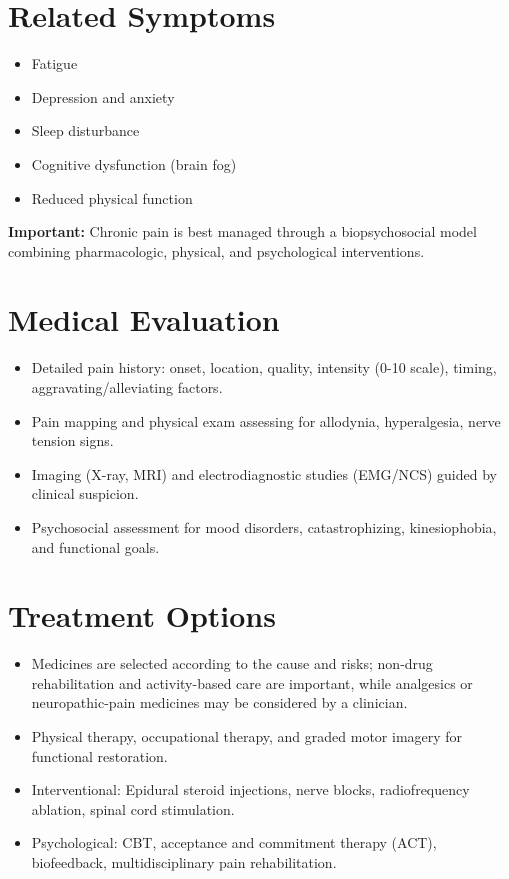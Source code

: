 \section*{Related Symptoms}
\begin{itemize}
  \item Fatigue
  \item Depression and anxiety
  \item Sleep disturbance
  \item Cognitive dysfunction (brain fog)
  \item Reduced physical function
\end{itemize}
\textbf{Important:} Chronic pain is best managed through a biopsychosocial model combining pharmacologic, physical, and psychological interventions.

\section*{Medical Evaluation}
\begin{itemize}
  \item Detailed pain history: onset, location, quality, intensity (0-10 scale), timing, aggravating/alleviating factors.
  \item Pain mapping and physical exam assessing for allodynia, hyperalgesia, nerve tension signs.
  \item Imaging (X-ray, MRI) and electrodiagnostic studies (EMG/NCS) guided by clinical suspicion.
  \item Psychosocial assessment for mood disorders, catastrophizing, kinesiophobia, and functional goals.
\end{itemize}

\section*{Treatment Options}
\begin{itemize}
  \item Medicines are selected according to the cause and risks; non-drug rehabilitation and activity-based care are important, while analgesics or neuropathic-pain medicines may be considered by a clinician.
  \item Physical therapy, occupational therapy, and graded motor imagery for functional restoration.
  \item Interventional: Epidural steroid injections, nerve blocks, radiofrequency ablation, spinal cord stimulation.
  \item Psychological: CBT, acceptance and commitment therapy (ACT), biofeedback, multidisciplinary pain rehabilitation.
\end{itemize}

